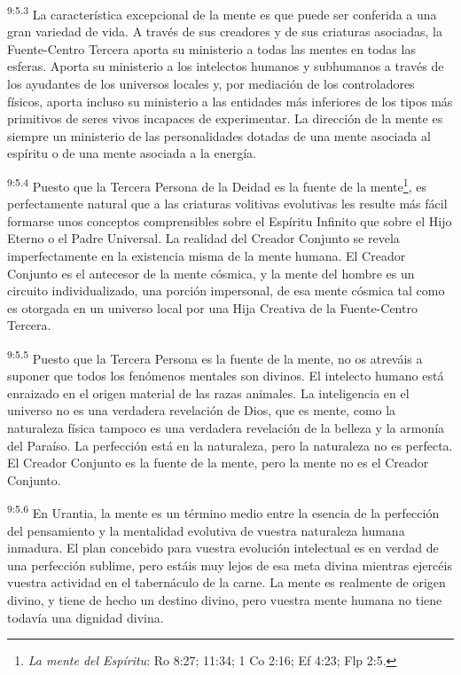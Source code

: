 \par
\textsuperscript{9:5.3} La característica excepcional de la mente es que puede ser conferida a una gran variedad de vida. A través de sus creadores y de sus criaturas asociadas, la Fuente-Centro Tercera aporta su ministerio a todas las mentes en todas las esferas. Aporta su ministerio a los intelectos humanos y subhumanos a través de los ayudantes de los universos locales y, por mediación de los controladores físicos, aporta incluso su ministerio a las entidades más inferiores de los tipos más primitivos de seres vivos incapaces de experimentar. La dirección de la mente es siempre un ministerio de las personalidades dotadas de una mente asociada al espíritu o de una mente asociada a la energía.

\par
\textsuperscript{9:5.4} Puesto que la Tercera Persona de la Deidad es la fuente de la mente\footnote{\textit{La mente del Espíritu}: Ro 8:27; 11:34; 1 Co 2:16; Ef 4:23; Flp 2:5.}, es perfectamente natural que a las criaturas volitivas evolutivas les resulte más fácil formarse unos conceptos comprensibles sobre el Espíritu Infinito que sobre el Hijo Eterno o el Padre Universal. La realidad del Creador Conjunto se revela imperfectamente en la existencia misma de la mente humana. El Creador Conjunto es el antecesor de la mente cósmica, y la mente del hombre es un circuito individualizado, una porción impersonal, de esa mente cósmica tal como es otorgada en un universo local por una Hija Creativa de la Fuente-Centro Tercera.

\par
\textsuperscript{9:5.5} Puesto que la Tercera Persona es la fuente de la mente, no os atreváis a suponer que todos los fenómenos mentales son divinos. El intelecto humano está enraizado en el origen material de las razas animales. La inteligencia en el universo no es una verdadera revelación de Dios, que es mente, como la naturaleza física tampoco es una verdadera revelación de la belleza y la armonía del Paraíso. La perfección está en la naturaleza, pero la naturaleza no es perfecta. El Creador Conjunto es la fuente de la mente, pero la mente no es el Creador Conjunto.

\par
\textsuperscript{9:5.6} En Urantia, la mente es un término medio entre la esencia de la perfección del pensamiento y la mentalidad evolutiva de vuestra naturaleza humana inmadura. El plan concebido para vuestra evolución intelectual es en verdad de una perfección sublime, pero estáis muy lejos de esa meta divina mientras ejercéis vuestra actividad en el tabernáculo de la carne. La mente es realmente de origen divino, y tiene de hecho un destino divino, pero vuestra mente humana no tiene todavía una dignidad divina.

